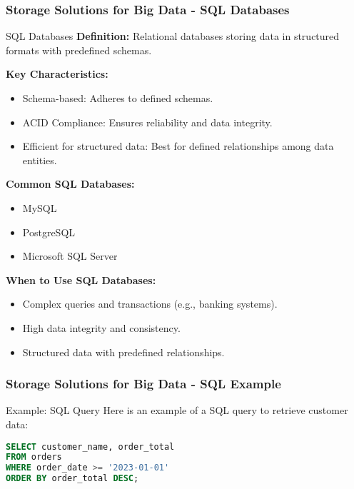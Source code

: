 \documentclass[aspectratio=169]{beamer}
\begin{document}
\begin{frame}[fragile]
    \frametitle{Storage Solutions for Big Data - SQL Databases}
    \begin{block}{SQL Databases}
        \textbf{Definition:} Relational databases storing data in structured formats with predefined schemas.
        
        \textbf{Key Characteristics:}
        \begin{itemize}
            \item Schema-based: Adheres to defined schemas.
            \item ACID Compliance: Ensures reliability and data integrity.
            \item Efficient for structured data: Best for defined relationships among data entities.
        \end{itemize}
        
        \textbf{Common SQL Databases:}
        \begin{itemize}
            \item MySQL
            \item PostgreSQL
            \item Microsoft SQL Server
        \end{itemize}
        
        \textbf{When to Use SQL Databases:}
        \begin{itemize}
            \item Complex queries and transactions (e.g., banking systems).
            \item High data integrity and consistency.
            \item Structured data with predefined relationships.
        \end{itemize}
    \end{block}
\end{frame}

\begin{frame}[fragile]
    \frametitle{Storage Solutions for Big Data - SQL Example}
    \begin{block}{Example: SQL Query}
        Here is an example of a SQL query to retrieve customer data:
        \begin{lstlisting}[language=SQL]
SELECT customer_name, order_total 
FROM orders 
WHERE order_date >= '2023-01-01'
ORDER BY order_total DESC;
        \end{lstlisting}
    \end{block}
\end{frame}
\end{document}

